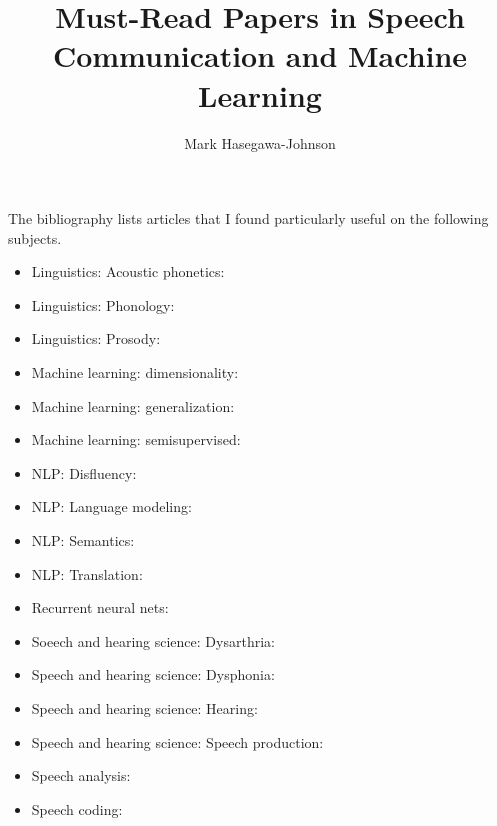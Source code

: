 \documentclass{article}
\title{Must-Read Papers in Speech Communication and Machine Learning}
\author{Mark Hasegawa-Johnson}
\begin{document}
\maketitle

The bibliography lists articles that I found particularly useful on
the following subjects.

\begin{itemize}
\item Linguistics: Acoustic phonetics:~\cite{Blumstein79,Cranen87,Crystal88,Fant87,Fujimura62b,Hillenbrand95,KewleyPort83,LindauWebb86,Lisker75,Ohman65a,Stevens89a,Stevens87,Stevens93b,Syrdal86,Zue79}
\item Linguistics: Phonology:~\cite{Browman92,Jakobson52,Keyser94,Ohala89}
\item Linguistics: Prosody:~\cite{Cole03,Fougeron97b,Lindblom90,Price91,Silverman92,Tseng05,Wightman92}
\item Machine learning: dimensionality:~\cite{Aggarwal06,Roweis00b}
\item Machine learning: generalization:~\cite{Barron93,Barron94,Blumer89,Freund99,Haussler88,Haussler92,Valiant84}
\item Machine learning: semisupervised:~\cite{Cohn94,Dempster77}
\item NLP: Disfluency:~\cite{Heeman99,Liu03b,Nakatani94}
\item NLP: Language modeling:~\cite{Bellegarda00,Bilmes03b,Brown92b,Chen08,Miller63,Pargellis04,Wang04b}
\item NLP: Semantics:~\cite{Copestake99,Deerwester90}
\item NLP: Translation:~\cite{Brown93}
\item Recurrent neural nets:~\cite{Cho15}
\item Soeech and hearing science: Dysarthria:~\cite{Chen01,Darley69,Doyle97,Hustad03,Kent99,Kim10d,Weismer00,Yunusova05}
\item Speech and hearing science: Dysphonia:~\cite{Hertrich97,Herzel94,Ward69,Yumoto82}
\item Speech and hearing science: Hearing:~\cite{Brown94,Delgutte84a,Delgutte84d,Lyon96,Patterson76}
\item Speech and hearing science: Speech production:~\cite{Alwan97,Harshman77,Honda92,Ishizaka72b,Nam03,Stone90,Narayanan95a,Perkell93,Perrier96,Rothenberg83,Saltzman89,ShattuckHufnagel79,VatikiotisBateson93}
\item Speech analysis:~\cite{Duifhuis82,Mermelstein67,Mermelstein75,Noll67,Ozbek11a,Rabiner76,Schroeder67}
\item Speech coding:~\cite{Conway82,Schroeder85,Lamblin89}

\end{itemize}
\end{document}
